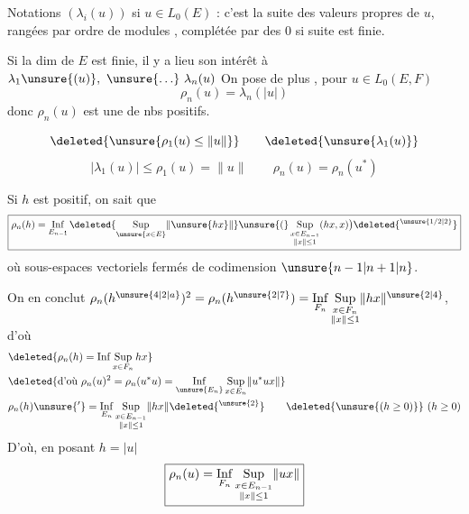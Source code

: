 
Notations $(\lambda_i(u))$ si $u\in L_0(E)$ : c'est la suite des valeurs  propres  de $u$, rangées par ordre de modules  , complétée par des $0$ si  suite est finie.

Si la dim de $E$ est finie,  il y a lieu   son intérêt  à $\lambda_1\unsure{(u)},\ \unsure{\ldots}\ \lambda_n(u)$  On pose de plus  , pour $u\in L_0(E,F)$
\[
\boxed{\boxed{\rho_n(u)=\lambda_n(\lvert u\rvert)}}
\]
donc $\rho_n(u)$ est une   de nbs positifs.

\[
\deleted{\unsure{\rho_1(u)\leq\lVert u\rVert}}\qquad\deleted{\unsure{\lambda_1(u)}}
\]
\[
\boxed{\lvert\lambda_1(u)\rvert\leq\rho_1(u)=\lVert u\rVert}
\qquad\boxed{\rho_n(u)=\rho_n(u^*)}
\]

Si $h$ est  positif, on sait que
\[
\boxed{\rho_n(h)=\mathop{\rm Inf}\limits_{E_{n-1}}
\deleted{\mathop{\rm Sup}\limits_{\unsure{x\in E}}\lVert\unsure{hx}\rVert}
\unsure{(}\mathop{\rm Sup}\limits_{\substack{x\in E_{n-1}\\\lVert x\rVert\leq1}}(hx,x)\bigr)\deleted{{}^{\unsure{1/2|2}}}}
\]
 où   sous-espaces vectoriels fermés de codimension $\unsure{n-1|n+1|n}$. 

On en conclut $\rho_n(h^{\unsure{4|2|a}})^2=\rho_n(h^{\unsure{2|7}})=\mathop{\rm Inf}\limits_{F_n}\mathop{\rm Sup}\limits_{\substack{x\in F_n\\\lVert x\rVert\leq1}}\lVert hx\rVert^{\unsure{2|4}}$,  d'où
\[
\begin{aligned}
&\deleted{\rho_n(h)=\mathop{\rm Inf}\mathop{\rm Sup}\limits_{x\in F_n}hx}\\
&\deleted{\text{d'où }\rho_n(u)^2=\rho_n(u^*u)=\mathop{\rm Inf}\limits_{\unsure{E_n}}\mathop{\rm Sup}\limits_{x\in E_n}\lVert u^*ux\rVert}\\
&\rho_n(h)\unsure{'}=\mathop{\rm Inf}\limits_{E_n}\mathop{\rm Sup}\limits_{\substack{x\in E_{n-1}\\\lVert x\rVert\leq1}}\lVert hx\rVert\deleted{{}^{\unsure{2}}}\qquad \deleted{\unsure{(h\geq0)}}\ (h\geq0)
\end{aligned}
\]
D'où, en posant $h=\lvert u\rvert$
\[
\boxed{\rho_n(u)=\mathop{\rm Inf}\limits_{F_n}\mathop{\rm Sup}\limits_{\substack{x\in E_{n-1}\\\lVert x\rVert\leq1}}\lVert ux\rVert}
\]

